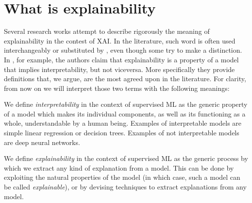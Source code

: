 \section{What is explainability}
\label{sec:whatisexplainability}
Several research works attempt to describe rigorously the meaning of explainability in the contest of XAI. In the literature, such word is often used interchangeably or substituted by , even though some try to make a distinction. In \cite{gilpin2018explaining}, for example, the authors claim that explainability is a property of a model that implies interpretability, but not viceversa. More specifically
they provide definitions that, we argue, are the most agreed upon in the literature. For clarity, from now on we will interpret those two terms with the following meanings:

\begin{definition}[Interpretability]
	\label{def:interpretability}
	We define \textit{interpretability} in the context of supervised ML as the generic property of a model which makes its individual components, as well as its functioning as a whole, understandable by a human being. Examples of interpretable models are simple linear regression or decision trees. Examples of not interpretable models are deep neural networks.
\end{definition}

\begin{definition}[Explainability]
	\label{def:explainability}
	We define \textit{explainability} in the context of supervised ML as the generic process by which we extract any kind of explanation from a model. This can be done by exploiting the natural properties of the model (in which case, such a model can be called \textit{explainable}), or by devising techniques to extract explanations from any model. 
	
\end{definition}


